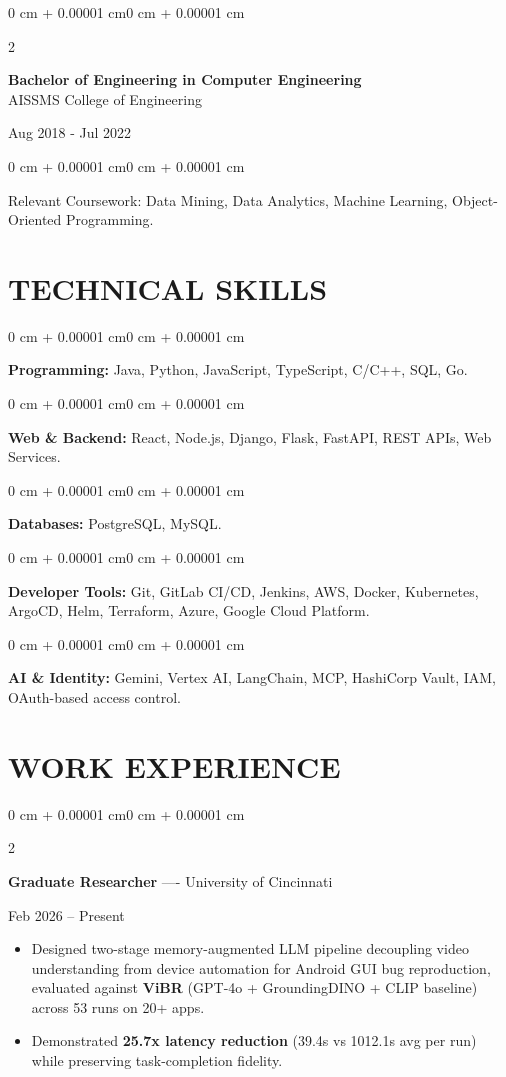 \documentclass[10pt, letterpaper]{article}
\newenvironment{highlights}{
    \begin{itemize}[
        topsep=0.10 cm,
        parsep=0.06 cm,
        partopsep=0pt,
        itemsep=0.06 cm,
        leftmargin=12pt
    ]
}{
    \end{itemize}
}
\newenvironment{onecolentry}{
    \begin{adjustwidth}{0 cm + 0.00001 cm}{0 cm + 0.00001 cm}
}{
    \end{adjustwidth}
}
\newenvironment{twocolentry}[2][]{
    \onecolentry
    \def\secondColumn{#2}
    \setcolumnwidth{\fill, 4.5 cm}
    \begin{paracol}{2}
}{
    \switchcolumn \raggedleft \secondColumn
    \end{paracol}
    \endonecolentry
}
\begin{document}
\begin{twocolentry}{
    Aug 2018 - Jul 2022
}
    \textbf{Bachelor of Engineering in Computer Engineering} \\
    AISSMS College of Engineering
\end{twocolentry}
\begin{onecolentry}
Relevant Coursework: Data Mining, Data Analytics, Machine Learning, Object-Oriented Programming.
\end{onecolentry}
\section{TECHNICAL SKILLS}
\begin{onecolentry}
\textbf{Programming:} Java, Python, JavaScript, TypeScript, C/C++, SQL, Go.
\end{onecolentry}
\vspace{0.06 cm}
\begin{onecolentry}
\textbf{Web \& Backend:} React, Node.js, Django, Flask, FastAPI, REST APIs, Web Services.
\end{onecolentry}
\vspace{0.06 cm}
\begin{onecolentry}
\textbf{Databases:} PostgreSQL, MySQL.
\end{onecolentry}
\vspace{0.06 cm}
\begin{onecolentry}
\textbf{Developer Tools:} Git, GitLab CI/CD, Jenkins, AWS, Docker, Kubernetes, ArgoCD, Helm, Terraform, Azure, Google Cloud Platform.
\end{onecolentry}
\vspace{0.06 cm}
\begin{onecolentry}
\textbf{AI \& Identity:} Gemini, Vertex AI, LangChain, MCP, HashiCorp Vault, IAM, OAuth-based access control.
\end{onecolentry}

\section{WORK EXPERIENCE}
\begin{twocolentry}{Feb 2026 -- Present}
\textbf{Graduate Researcher} ---- University of Cincinnati
\end{twocolentry}
\begin{highlights}
  \item Designed two-stage memory-augmented LLM pipeline decoupling video understanding from device automation for Android GUI bug reproduction, evaluated against \textbf{ViBR} (GPT-4o + GroundingDINO + CLIP baseline) across 53 runs on 20+ apps.
  \item Demonstrated \textbf{25.7x latency reduction} (39.4s vs 1012.1s avg per run) while preserving task-completion fidelity.
\end{highlights}
\end{document}
